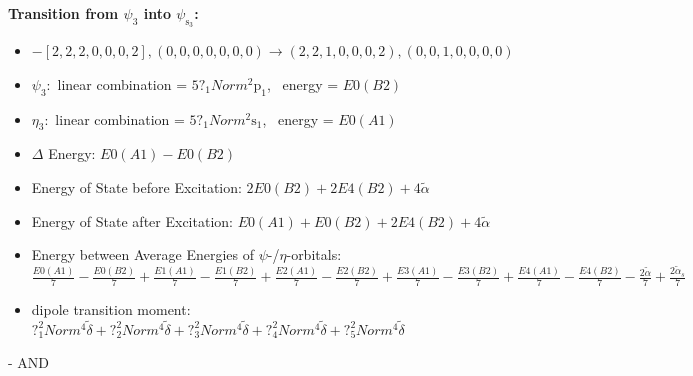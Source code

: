 \documentclass[12pt,a4paper]{article}
\begin{document}
        \noindent\textbf{Transition from $\psi_{3}$ into $\psi_{\text{s}_{3}}$:}
        \begin{itemize}
            \item $- [2, 2, 2, 0, 0, 0, 2], (0, 0, 0, 0, 0, 0, 0) \rightarrow (2, 2, 1, 0, 0, 0, 2), (0, 0, 1, 0, 0, 0, 0)$
        
            \item $\psi_{3}:$ linear combination = $5 ?_{1} Norm^{2} \text{p}_{1}$, \
            energy = $E0(B2)$
            
            \item $\eta_{3}:$ linear combination = $5 ?_{1} Norm^{2} \text{s}_{1}$, \
            energy = $E0(A1)$
            
                \item $\Delta$ Energy: $E0(A1) - E0(B2)$
                \item Energy of State before Excitation: $2 E0(B2) + 2 E4(B2) + 4 \tilde{\alpha}$
                \item Energy of State after Excitation: $E0(A1) + E0(B2) + 2 E4(B2) + 4 \tilde{\alpha}$
                \item Energy between Average Energies of $\psi$-/$\eta$-orbitals: $\frac{E0(A1)}{7} - \frac{E0(B2)}{7} + \frac{E1(A1)}{7} - \frac{E1(B2)}{7} + \frac{E2(A1)}{7} - \frac{E2(B2)}{7} + \frac{E3(A1)}{7} - \frac{E3(B2)}{7} + \frac{E4(A1)}{7} - \frac{E4(B2)}{7} - \frac{2 \tilde{\alpha}}{7} + \frac{2 \tilde{\alpha}_{s}}{7}$
            
            \item dipole transition moment: $?_{1}^{2} Norm^{4} \tilde{\delta} + ?_{2}^{2} Norm^{4} \tilde{\delta} + ?_{3}^{2} Norm^{4} \tilde{\delta} + ?_{4}^{2} Norm^{4} \tilde{\delta} + ?_{5}^{2} Norm^{4} \tilde{\delta}$
        
        \end{itemize}
        
 -  AND 
\end{document}

